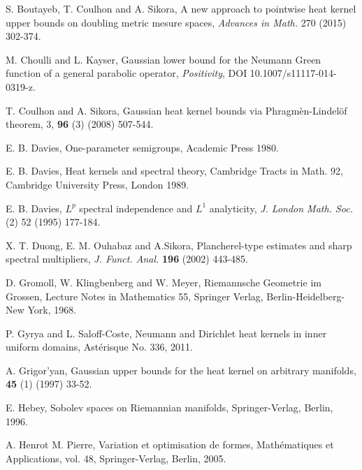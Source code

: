 \documentclass[10pt]{amsart}
\theoremstyle{definition}
\begin{document}
\begin{thebibliography}{99}

\newblock S. Boutayeb, T. Coulhon and A. Sikora, 
\newblock A new approach to pointwise heat kernel upper bounds on doubling metric mesure spaces, 
\newblock \emph{Advances in Math.} 270 (2015) 302-374.

 M. Choulli and L. Kayser,
\newblock Gaussian lower bound for the Neumann Green function of a general parabolic operator,
\newblock \emph{Positivity}, DOI 10.1007/s11117-014-0319-z.

\newblock T. Coulhon and A. Sikora,
\newblock Gaussian heat kernel bounds via Phragm\`en-Lindel\"of theorem, 
 3, \textbf{96} (3) (2008) 507-544.

\newblock E. B. Davies,
\newblock One-parameter semigroups,
\newblock Academic Press 1980.

\newblock E. B. Davies,
\newblock Heat kernels and spectral theory, 
\newblock Cambridge Tracts in Math. 92, Cambridge University Press, London 1989.

\newblock E. B. Davies,
\newblock $L^p$  spectral independence and $L^1$ analyticity, 
\newblock \emph{J. London Math. Soc.}  (2) 52 (1995) 177-184.

\newblock X. T. Duong,  E. M. Ouhabaz and A.Sikora, 
\newblock Plancherel-type estimates and sharp spectral multipliers,
\newblock \emph{J. Funct. Anal.}  \textbf{196}  (2002) 443-485.

\newblock D. Gromoll, W. Klingbenberg and W. Meyer, 
\newblock Riemannsche Geometrie im Grossen, 
\newblock Lecture Notes in Mathematics 55, Springer Verlag, Berlin-Heidelberg-New York, 1968.

\newblock P. Gyrya and L.  Saloff-Coste, 
\newblock Neumann and Dirichlet heat kernels in inner uniform domains, 
\newblock Ast\'erisque No. 336, 2011. 

\newblock A. Grigor'yan,
\newblock Gaussian upper bounds for the heat kernel on arbitrary manifolds, 
  \textbf{45} (1) (1997) 33-52.

\newblock E. Hebey,
\newblock Sobolev spaces on Riemannian manifolds,
\newblock Springer-Verlag, Berlin, 1996.

\newblock A. Henrot M. Pierre,
\newblock Variation et optimisation de formes, 
\newblock Math\'ematiques et Applications, vol. 48, Springer-Verlag, Berlin, 2005.


\end{thebibliography}
\end{document}
